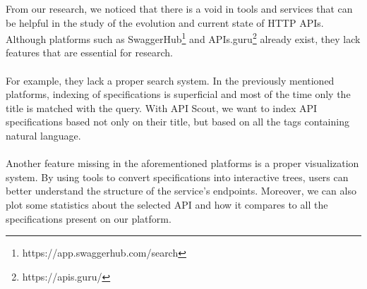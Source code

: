 From our research, we noticed that there is a void in tools and services that can be helpful in the study of the evolution and current state of HTTP APIs.
Although platforms such as SwaggerHub\footnote{https://app.swaggerhub.com/search} and APIs.guru\footnote{https://apis.guru/} already exist, they lack features that are essential for research. \\ \\
For example, they lack a proper search system.
In the previously mentioned platforms, indexing of specifications is superficial and most of the time only the title is matched with the query.
With API Scout, we want to index API specifications based not only on their title, but based on all the tags containing natural language. \\ \\
Another feature missing in the aforementioned platforms is a proper visualization system.
By using tools to convert specifications into interactive trees, users can better understand the structure of the service's endpoints.
Moreover, we can also plot some statistics about the selected API and how it compares to all the specifications present on our platform.